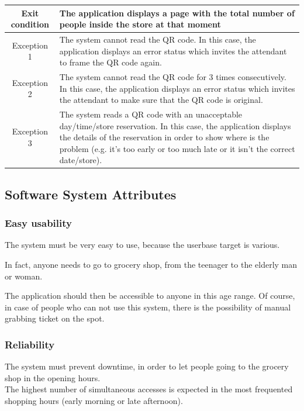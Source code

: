 \documentclass[table, 12pt]{article}
\begin{document}
\begin{longtable}{|c| p{10cm}|}
    \hline
    Exit condition   & The application displays a page with the total number of people inside the store at that moment
    \\
    \hline
    \hline
    Exception 1      & The system cannot read the QR code. In this case, the application displays an error status which invites the attendant to frame the QR code again.                                                                                                                 \\
    \hline
    Exception 2      & The system cannot read the QR code for 3 times consecutively. In this case, the application displays an error status which invites the attendant to make sure that the QR code is original.                                                                        \\
    \hline
    Exception 3      & The system reads a QR code with an unacceptable day/time/store reservation. In this case, the application displays the details of the reservation in order to show where is the problem (e.g. it's too early or too much late or it isn't the correct date/store). \\
    \hline
\end{longtable}


\subsection{Software System Attributes}
\subsubsection{Easy usability}
The system must be very easy to use, because the userbase target is various.

In fact, anyone needs to go to grocery shop, from the teenager to the elderly man or woman.

The application should then be accessible to anyone in this age range. Of course, in case of people who can not use this system, there is the possibility of manual grabbing ticket on the spot.
\subsubsection{Reliability}
The system must prevent downtime, in order to let people going to the grocery shop in the opening hours. \\
The highest number of simultaneous accesses is expected in the most frequented shopping hours (early morning or late afternoon).
\end{document}
